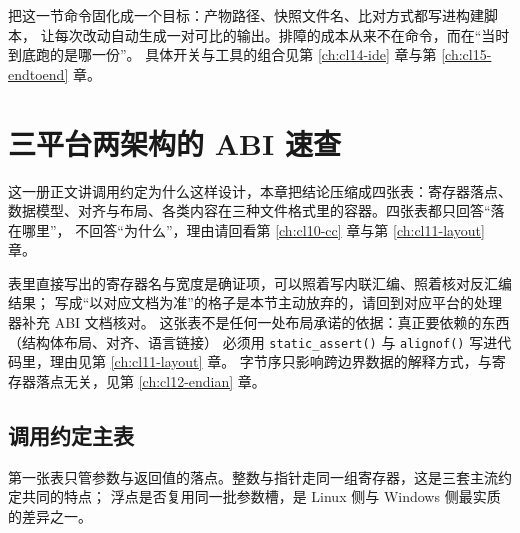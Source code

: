 \documentclass[12pt,a4paper,fontset=fandol]{ctexbook}
\newcommand{\Fn}[1]{\texttt{#1()}}
\newcommand{\Nix}{\textsf{Linux}}
\newcommand{\Win}{\textsf{Windows}}
\begin{document}
\begin{bestpractice}[title=把工具名写进构建脚本而不是聊天记录]
把这一节命令固化成一个目标：产物路径、快照文件名、比对方式都写进构建脚本，
让每次改动自动生成一对可比的输出。排障的成本从来不在命令，而在“当时到底跑的是哪一份”。
具体开关与工具的组合见第 \ref{ch:cl14-ide} 章与第 \ref{ch:cl15-endtoend} 章。
\end{bestpractice}

\chapter{三平台两架构的 ABI 速查}\label{ap:clB-abi}

这一册正文讲调用约定为什么这样设计，本章把结论压缩成四张表：寄存器落点、
数据模型、对齐与布局、各类内容在三种文件格式里的容器。四张表都只回答“落在哪里”，
不回答“为什么”，理由请回看第 \ref{ch:cl10-cc} 章与第 \ref{ch:cl11-layout} 章。

\begin{abibox}[title=这张表的可信边界]
表里直接写出的寄存器名与宽度是确证项，可以照着写内联汇编、照着核对反汇编结果；
写成“以对应文档为准”的格子是本节主动放弃的，请回到对应平台的处理器补充 ABI 文档核对。
这张表不是任何一处布局承诺的依据：真正要依赖的东西（结构体布局、对齐、语言链接）
必须用 \Fn{static\_assert} 与 \Fn{alignof} 写进代码里，理由见第 \ref{ch:cl11-layout} 章。
字节序只影响跨边界数据的解释方式，与寄存器落点无关，见第 \ref{ch:cl12-endian} 章。
\end{abibox}

\section{调用约定主表}

第一张表只管参数与返回值的落点。整数与指针走同一组寄存器，这是三套主流约定共同的特点；
浮点是否复用同一批参数槽，是 \Nix{} 侧与 \Win{} 侧最实质的差异之一。
\end{document}
